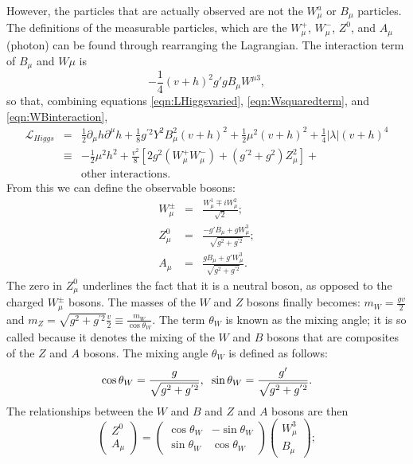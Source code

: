 However, the particles that are actually observed are not the $W_\mu^a$ or $B_\mu$ particles. The definitions of the measurable particles, which are the $W_\mu^+$, $W_\mu^-$, $Z^0$, and $A_\mu$ (photon) can be found through rearranging the Lagrangian. The interaction term of $B_\mu$ and $W\mu$ is 
\begin{equation}
-\frac{1}{4}(v+h)^2 g'g B_\mu W^{\mu 3},
\label{eqn:WBinteraction}
\end{equation}
so that, combining equations \ref{eqn:LHiggsvaried}, \ref{eqn:Wsquaredterm}, and \ref{eqn:WBinteraction},
\begin{eqnarray}
\mathcal L_{Higgs} &=&  \frac{1}{2}\partial_\mu h \partial^\mu h + \frac{1}{8}g^{'2}Y^2B_\mu^2(v+h)^2 + \frac{1}{2}\mu^2(v + h)^2 + \frac{1}{4}|\lambda|(v+h)^4 \nonumber \\
&\equiv& -\frac{1}{2}\mu^2h^2 + \frac{v^2}{8}\left[2g^2(W_\mu^+W_\mu^-) + (g^{'2} +g^2)Z_\mu^2 \right] + \nonumber \\
&& \mbox{other interactions}.
\label{eqn:Lredefined}
\end{eqnarray}
From this we can define the observable bosons:
\begin{eqnarray}
W^\pm_\mu &=&  \frac{W_\mu^1 \mp iW_\mu^2}{\sqrt{2}};\\
Z_\mu^0 &=& \frac{-g'B_\mu + gW_\mu^3}{\sqrt{g^2+g^{'2}}};\\
A_\mu &=&  \frac{gB_\mu + g'W_\mu^3}{\sqrt{g^2+g^{'2}}}.
\label{eqn:realbosonsdefined}
\end{eqnarray}
The zero in $Z_\mu^0$ underlines the fact that it is a neutral boson, as opposed to the charged $W^\pm_\mu$ bosons. The masses of the $W$ and $Z$ bosons finally becomes: $m_W = \frac{gv}{2}$ and $m_Z = \sqrt{g^2 + g^{'2}}\frac{v}{2} \equiv \frac{m_W}{\cos\theta_W}$. The term $\theta_W$ is known as the mixing angle; it is so called because it denotes the mixing of the $W$ and $B$ bosons that are composites of the $Z$ and $A$ bosons. The mixing angle $\theta_W$ is defined as follows:
\begin{eqnarray}
\cos\theta_W = \frac{g}{\sqrt{g^2 + g^{'2}}}, \hspace{2mm} \sin\theta_W = \frac{g'}{\sqrt{g^2 + g^{'2}}}.
\label{eqn:mixingangle}
\end{eqnarray}
The relationships between the $W$ and $B$ and $Z$ and $A$ bosons are then
\begin{equation}
\left( \begin{array}{c} Z^0 \\ A_\mu \end{array} \right) = \left( \begin{array}{cc} \cos \theta_W & -\sin \theta_W \\ \sin\theta_W & \cos\theta_W \end{array} \right) \left( \begin{array} {c} W^3_\mu \\ B_\mu \end{array} \right);
\label{eqn:ZAWBmixing}
\end{equation}

